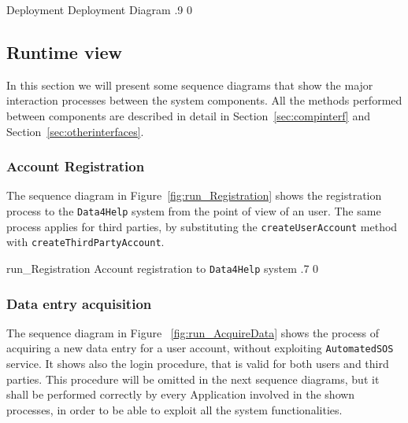 \documentclass[../DD0.tex]{subfiles}
\begin{document}
    \fetchUML
      {Deployment}
      {Deployment Diagram}
      {.9}           %
      {0}           %

  \clearpage
  \subsection{Runtime view}
  \label{sec:runtview}

    In this section we will present some sequence diagrams that show the major interaction processes between the system components. All the methods performed between components are described in detail in Section~\ref{sec:compinterf} and Section~\ref{sec:otherinterfaces}.


    \subsubsection{Account Registration}
    \label{sec:runregistration}

      The sequence diagram in Figure~\ref{fig:run_Registration} shows the registration process to the \texttt{Data4Help} system from the point of view of an user. The same process applies for third parties, by substituting the \texttt{createUserAccount} method with \texttt{createThirdPartyAccount}.

      \fetchUML
        {run_Registration}
        {Account registration to \texttt{Data4Help} system}
        {.7}           %
        {0}           %

    \clearpage
    \subsubsection{Data entry acquisition}
    \label{sec:userdata}

      The sequence diagram in Figure ~\ref{fig:run_AcquireData} shows the process of acquiring a new data entry for a user account, without exploiting \texttt{AutomatedSOS} service. It shows also the login procedure, that is valid for both users and third parties. This procedure will be omitted in the next sequence diagrams, but it shall be performed correctly by every Application involved in the shown processes, in order to be able to exploit all the system functionalities.
\end{document}
